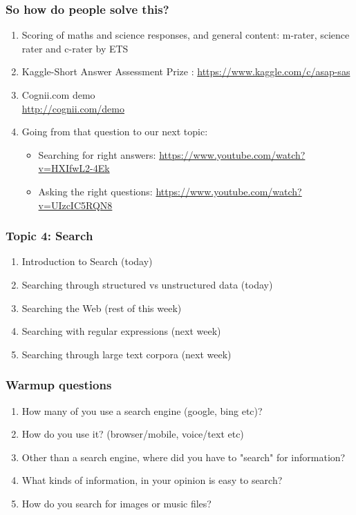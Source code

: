 \documentclass{beamer}
\begin{document}
\begin{frame}
\frametitle{So how do people solve this?}%
\begin{enumerate}
\item Scoring of maths and science responses, and general content: m-rater, science rater and c-rater by ETS
\item Kaggle-Short Answer Assessment Prize : \url{https://www.kaggle.com/c/asap-sas}
\item Cognii.com demo \\ \url{http://cognii.com/demo} \pause
\item Going from that question to our next topic: 
\begin{itemize}
\item Searching for right answers: \url{https://www.youtube.com/watch?v=HXIfwL2-4Ek}
\item Asking the right questions: \url{https://www.youtube.com/watch?v=UIzcIC5RQN8}
\end{itemize}
\end{enumerate}
\end{frame} %

\begin{frame}
\frametitle{Topic 4: Search}%
\begin{enumerate}
\item Introduction to Search (today)
\item Searching through structured vs unstructured data (today)
\item Searching the Web (rest of this week) %
\item Searching with regular expressions (next week)
\item Searching through large text corpora (next week)
\end{enumerate}
\end{frame}

\begin{frame}
\frametitle{Warmup questions}%
\begin{enumerate}
\item How many of you use a search engine (google, bing etc)? \pause
\item How do you use it? (browser/mobile, voice/text etc) \pause
\item Other than a search engine, where did you have to "search" for information? \pause
\item What kinds of information, in your opinion is easy to search? \pause
\item How do you search for images or music files? \pause
\end{enumerate}
\end{frame}
\end{document}
